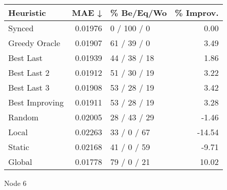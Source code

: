 \begin{tabular}{lrlr}
\toprule
\textbf{Heuristic} & \textbf{MAE ↓} & \textbf{\% Be/Eq/Wo} & \textbf{\% Improv.} \\
\midrule
            Synced &        0.01976 &          0 / 100 / 0 &                0.00 \\
     Greedy Oracle &        0.01907 &          61 / 39 / 0 &                3.49 \\
         Best Last &        0.01939 &         44 / 38 / 18 &                1.86 \\
       Best Last 2 &        0.01912 &         51 / 30 / 19 &                3.22 \\
       Best Last 3 &        0.01908 &         53 / 28 / 19 &                3.42 \\
    Best Improving &        0.01911 &         53 / 28 / 19 &                3.28 \\
            Random &        0.02005 &         28 / 43 / 29 &               -1.46 \\
             Local &        0.02263 &          33 / 0 / 67 &              -14.54 \\
            Static &        0.02168 &          41 / 0 / 59 &               -9.71 \\
            Global &        0.01778 &          79 / 0 / 21 &               10.02 \\
\bottomrule
\end{tabular}
\caption{Node 6}
\label{tab:non_lr05_le2_bs4_6}
